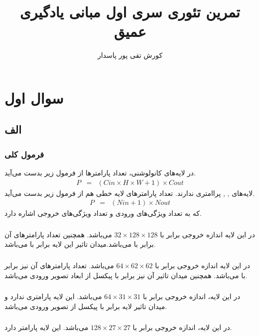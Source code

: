 \documentclass[12pt]{article}
\title{تمرین تئوری سری اول مبانی یادگیری عمیق}
\author{کورش تقی پور پاسدار 
	\lr{400521207}}
\begin{document}
	\maketitle
	\tableofcontents
	\section{سوال اول}
	\subsection{الف}
	
	\subsubsection{فرمول کلی}
	در لایه‌های کانولوشنی، تعداد پارامتر‌ها از فرمول زیر بدست می‌آید.
	\begin{eqnarray*}
		P &=& (Cin\times H\times W + 1)\times Cout 
	\end{eqnarray*}
	لایه‌های , ,  پراامتری ندارند.
	تعداد پارامتر‌های لایه خطی هم از فرمول زیر بدست می‌آید.
	\begin{eqnarray*}
		P &=& (Nin + 1)\times Nout 
	\end{eqnarray*}
	که  به تعداد ویژگی‌های ورودی و  تعداد ویژگی‌های خروجی اشاره دارد.
	\subsubsection{}
	در این لایه اندازه خروجی برابر با $32\times128\times128$ می‌باشد. همچنین تعداد پارامترهای آن برابر با  می‌باشد.میدان تاثیر این لایه برابر با  می‌باشد.
	\subsubsection{}
	در این لایه اندازه خروجی برابر با $64\times62\times62$ می‌باشد. تعداد پارامترهای آن نیز برابر با  می‌باشد. همچنین میدان تاثیر آن نیز برابر با  پیکسل از ابعاد تصویر ورودی می‌باشد.
	\subsubsection{}
	در این لایه، اندازه خروجی برابر با $64\times31\times31$ می‌باشد. این لایه پارامتری ندارد و میدان تاثیر لایه برابر با  پیکسل از تصویر ورودی می‌باشد.
	\subsubsection{}
	در این لایه، اندازه خروجی برابر با $128\times27\times27$ می‌باشد. این لایه  پارامتر دارد.
\end{document}

